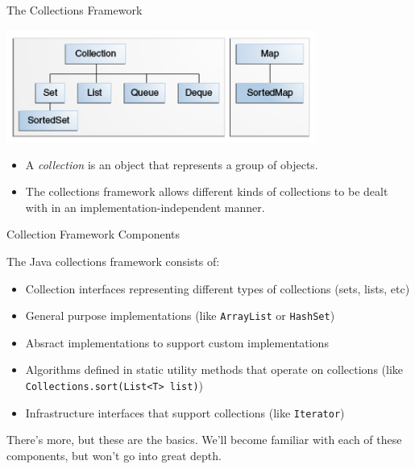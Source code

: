 \documentclass{beamer}
\author[Chris Simpkins]
{Christopher Simpkins \\\texttt{chris.simpkins@gatech.edu}}
\institute[Georgia Tech] %
\date[CS 1331]{}
\begin{document}
\begin{frame}
  \titlepage
\end{frame}


\begin{frame}[fragile]{The Collections Framework}

\begin{center}
\includegraphics[width=4in]{colls-coreInterfaces.png}
\end{center}

\begin{itemize}
\item A {\it collection} is an object that represents a group of objects.
\item The collections framework allows different kinds of collections to be dealt with in an implementation-independent manner.
\end{itemize}


\end{frame}

\begin{frame}[fragile]{Collection Framework Components}

The Java collections framework consists of:
\begin{itemize}
\item Collection interfaces representing different types of collections (sets, lists, etc)
\item General purpose implementations (like {\tt ArrayList} or {\tt HashSet})
\item Absract implementations to support custom implementations
\item Algorithms defined in static utility methods that operate on collections (like {\tt Collections.sort(List<T> list)})
\item Infrastructure interfaces that support collections (like {\tt Iterator})
\end{itemize}
There's more, but these are the basics.  We'll become familiar with each of these components, but won't go into great depth.

\end{frame}
\end{document}
